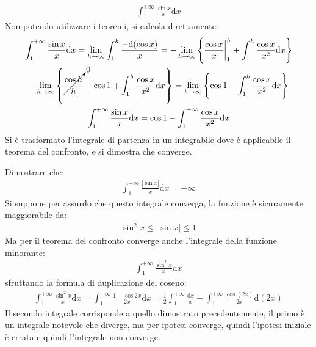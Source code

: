 \documentclass{article}
\newcommand{\df}{\mathrm{d}}
\newcommand{\intab}[4]{\displaystyle\int_{#1}^{#2}{#3}\df{#4}}
\numberwithin{equation}{subsection}
\begin{document}
\begin{gather*}
    \displaystyle\int_{1}^{+\infty}\frac{\sin x}x\df x
\end{gather*}
Non potendo utilizzare i teoremi, si calcola direttamente:
\begin{gather*}
    \displaystyle\int_{1}^{+\infty}\frac{\sin x}x\df x=
    \lim_{h\to\infty}\int_{1}^{h}\frac{-\df(\cos x)}x=
    -\lim_{h\to\infty}\left\{\frac{\cos x}{x}\bigg|_1^h+\intab{1}{h}{\frac{\cos x}{x^2}}{x}\right\}\\
    -\lim_{h\to\infty}\left\{\cancelto{0}{\frac{\cos h}{h}}-\cos1+\intab{1}{h}{\frac{\cos x}{x^2}}{x}\right\}=
    \lim_{h\to\infty}\left\{\cos1-\intab{1}{h}{\frac{\cos x}{x^2}}{x}\right\}\\
    \displaystyle\int_{1}^{+\infty}\frac{\sin x}x\df x=\cos1-\int_1^{+\infty}\frac{\cos x}{x^2}\df x
\end{gather*}
Si è trasformato l'integrale di partenza in un integrabile dove è applicabile il teorema del confronto, e si dimostra che converge. %


Dimostrare che:
\begin{gather*}
    \displaystyle\int_1^{+\infty}\frac{|\sin x|}{x}\df x=+\infty
\end{gather*}
Si suppone per assurdo che questo integrale converga, la funzione è sicuramente maggiorabile da:
\begin{gather*}
    \sin^2x\leq|\sin x|\leq1
\end{gather*}
Ma per il teorema del confronto converge anche l'integrale della funzione minorante:
\begin{gather*}
    \displaystyle\int_{1}^{+\infty}\frac{\sin^2 x}x\df x
\end{gather*}
sfruttando la formula di duplicazione del coseno:
\begin{gather*}
    \displaystyle\int_{1}^{+\infty}\frac{\sin^2 x}x\df x=
    \int_1^{+\infty}\frac{1-\cos2x}{2x}\df x=
    \frac{1}{2}\int_1^{+\infty}\frac{\df x}{x}-\int_1^{+\infty}\frac{\cos(2x)}{2x}\df (2x)
\end{gather*}
Il secondo integrale corrisponde a quello dimostrato precedentemente, il primo è un integrale notevole che diverge, ma per ipotesi converge, quindi l'ipotesi iniziale è errata e quindi l'integrale non converge. 
\end{document}
